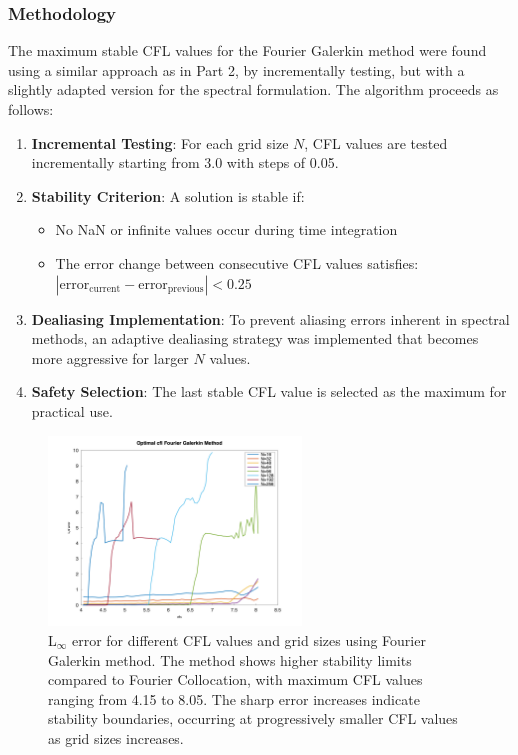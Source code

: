 \subsubsection{Methodology}
The maximum stable CFL values for the Fourier Galerkin method were found using a similar approach as in Part 2, by incrementally testing, but with a slightly adapted version for the spectral formulation. The algorithm proceeds as follows:

\begin{enumerate}
	\item \textbf{Incremental Testing}: For each grid size $N$, CFL values are tested incrementally starting from 3.0 with steps of 0.05.
	\item \textbf{Stability Criterion}: A solution is stable if:
	      \begin{itemize}
		      \item No NaN or infinite values occur during time integration
		      \item The error change between consecutive CFL values satisfies: $|\text{error}_{\text{current}} - \text{error}_{\text{previous}}| < 0.25$
	      \end{itemize}
	\item \textbf{Dealiasing Implementation}: To prevent aliasing errors inherent in spectral methods, an adaptive dealiasing strategy was implemented that becomes more aggressive for larger $N$ values.
	\item \textbf{Safety Selection}: The last stable CFL value is selected as the maximum for practical use.
\end{enumerate}

\begin{figure}[H]
	\centering
	\includegraphics[width=0.6\textwidth]{media/cfl_errors_fg_complete.png}
	\caption{L$_\infty$ error for different CFL values and grid sizes using Fourier Galerkin method. The method shows higher stability limits compared to Fourier Collocation, with maximum CFL values ranging from 4.15 to 8.05. The sharp error increases indicate stability boundaries, occurring at progressively smaller CFL values as grid sizes increases.}
	\label{fig:cfl_fg}
\end{figure}


